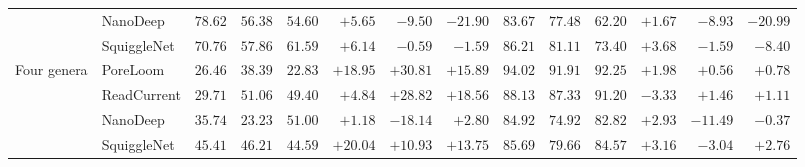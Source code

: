 \begin{tabular}{@{}llrrrrrrrrrrrr@{}}
 & NanoDeep & $78.62$ & $56.38$ & $54.60$ & $+5.65$ & $-9.50$ & $-21.90$ & $83.67$ & $77.48$ & $62.20$ & $+1.67$ & $-8.93$ & $-20.99$\\
 & SquiggleNet & $70.76$ & $57.86$ & $61.59$ & $+6.14$ & $-0.59$ & $-1.59$ & $86.21$ & $81.11$ & $73.40$ & $+3.68$ & $-1.59$ & $-8.40$\\
\addlinespace
Four genera & PoreLoom & $26.46$ & $38.39$ & $22.83$ & $+18.95$ & $+30.81$ & $+15.89$ & $94.02$ & $91.91$ & $92.25$ & $+1.98$ & $+0.56$ & $+0.78$\\
 & ReadCurrent & $29.71$ & $51.06$ & $49.40$ & $+4.84$ & $+28.82$ & $+18.56$ & $88.13$ & $87.33$ & $91.20$ & $-3.33$ & $+1.46$ & $+1.11$\\
 & NanoDeep & $35.74$ & $23.23$ & $51.00$ & $+1.18$ & $-18.14$ & $+2.80$ & $84.92$ & $74.92$ & $82.82$ & $+2.93$ & $-11.49$ & $-0.37$\\
 & SquiggleNet & $45.41$ & $46.21$ & $44.59$ & $+20.04$ & $+10.93$ & $+13.75$ & $85.69$ & $79.66$ & $84.57$ & $+3.16$ & $-3.04$ & $+2.76$\\
\bottomrule
\end{tabular}
\endgroup
